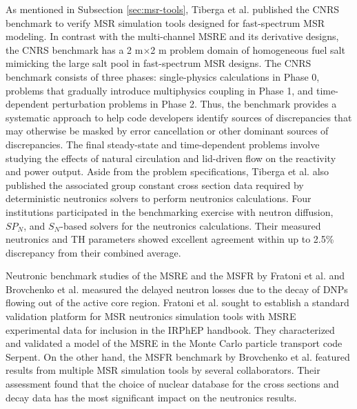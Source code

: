 As mentioned in Subsection \ref{sec:msr-tools}, Tiberga et al. \cite{tiberga_results_2020}
published the CNRS benchmark to verify \gls{MSR} simulation tools designed for
fast-spectrum \gls{MSR} modeling. In contrast with the multi-channel \gls{MSRE} and its derivative
designs, the CNRS benchmark has a 2 m$\times$2 m problem domain of homogeneous fuel salt mimicking
the large salt pool in fast-spectrum \gls{MSR} designs. The CNRS benchmark consists of three
phases: single-physics calculations in Phase 0, problems that gradually
introduce multiphysics coupling in Phase 1, and time-dependent perturbation problems in Phase
2. Thus, the benchmark provides a systematic approach to help code developers
identify sources of discrepancies that may otherwise be masked by error cancellation or other
dominant sources of discrepancies. The final steady-state and time-dependent problems involve
studying the effects of natural circulation and lid-driven flow on the reactivity and power output.
Aside from the problem specifications, Tiberga et al. also published the associated group
constant cross section data required by deterministic neutronics solvers to perform neutronics
calculations. Four institutions participated in the benchmarking exercise with neutron diffusion,
$SP_N$, and $S_N$-based solvers for the neutronics calculations. Their measured neutronics and
\gls{TH} parameters showed excellent agreement within up to 2.5\% discrepancy from their combined
average.

Neutronic benchmark studies of the \gls{MSRE} and the \gls{MSFR} by Fratoni et al.
\cite{fratoni_molten_2020} and Brovchenko et al. \cite{brovchenko_neutronic_2019} measured the
delayed neutron losses due to the decay of \glspl{DNP} flowing out of the active core region.
Fratoni et al. sought to establish a standard validation platform for \gls{MSR} neutronics
simulation tools with \gls{MSRE} experimental data for inclusion in the \gls{IRPhEP} handbook.
They characterized and validated a model of the \gls{MSRE} in the Monte Carlo particle transport
code Serpent. On the other hand, the \gls{MSFR} benchmark by Brovchenko et al. featured results
from multiple \gls{MSR} simulation tools by several collaborators. Their assessment found that
the choice of nuclear database for the cross sections and decay data has the most significant
impact on the neutronics results.

